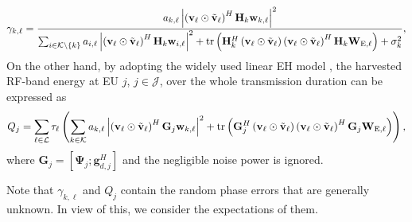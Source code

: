 \documentclass[12pt,draftclsnofoot, onecolumn]{IEEEtran}
\theoremstyle{plain}
\begin{document}
\begin{sloppypar}
\begin{align}\label{equ:SINR}
\gamma_{k,\ell} = \frac{a_{k,\ell}\left|\left( \mathbf v_\ell\odot\tilde {\mathbf v}_\ell\right)^H\mathbf H_k\mathbf w_{k,\ell}\right|^2}{\sum_{i\in \mathcal K\backslash\{k\}}a_{i,\ell}\left|\left( \mathbf v_\ell\odot\tilde {\mathbf v}_\ell\right)^H\mathbf H_k\mathbf w_{i,\ell}\right|^2 + {\rm tr}\left(\mathbf H_k^H\left( \mathbf v_\ell\odot\tilde {\mathbf v}_\ell\right)\left( \mathbf v_\ell\odot\tilde {\mathbf v}_\ell\right)^H\mathbf H_k\mathbf W_{\mathrm E,\ell}\right) + \sigma_k^2}, 
\end{align} 
On the other hand, by adopting the widely used linear EH model \cite{2020_Qingqing_SWIPT_letter,2020_Qingqing_SWIPT_QoS,2020_Cunhua_SWIPT}, the harvested RF-band energy at EU $j$, $j\in\mathcal J$, over the whole transmission duration can be expressed as 
\begin{align}\label{equ:E}
Q_j = \sum_{\ell\in\mathcal L}\tau_\ell\left(\sum_{k\in\mathcal K}a_{k,\ell}\left|\left( \mathbf v_\ell\odot\tilde {\mathbf v}_\ell\right)^H\mathbf G_j\mathbf w_{k,\ell} \right|^2 + {\rm tr}\left(\mathbf G_j^H\left( \mathbf v_\ell\odot\tilde {\mathbf v}_\ell\right)\left( \mathbf v_\ell\odot\tilde {\mathbf v}_\ell\right)^H\mathbf G_j\mathbf W_{\mathrm E, \ell} \right) \right), 
\end{align}
where $\mathbf G_j = \left[\mathbf \Psi_j;\mathbf g_{d,j}^H\right]$ and the negligible noise power is ignored.

Note that $\gamma_{k,\ell}$ and $Q_j$ contain the random phase errors that are generally unknown. In view of this, we consider the expectations of them.  



\end{sloppypar}
\end{document}
